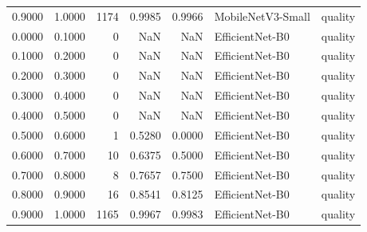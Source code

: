 \begin{tabular}{rrrrrll}
0.9000 & 1.0000 & 1174 & 0.9985 & 0.9966 & MobileNetV3-Small & quality \\
0.0000 & 0.1000 & 0 & NaN & NaN & EfficientNet-B0 & quality \\
0.1000 & 0.2000 & 0 & NaN & NaN & EfficientNet-B0 & quality \\
0.2000 & 0.3000 & 0 & NaN & NaN & EfficientNet-B0 & quality \\
0.3000 & 0.4000 & 0 & NaN & NaN & EfficientNet-B0 & quality \\
0.4000 & 0.5000 & 0 & NaN & NaN & EfficientNet-B0 & quality \\
0.5000 & 0.6000 & 1 & 0.5280 & 0.0000 & EfficientNet-B0 & quality \\
0.6000 & 0.7000 & 10 & 0.6375 & 0.5000 & EfficientNet-B0 & quality \\
0.7000 & 0.8000 & 8 & 0.7657 & 0.7500 & EfficientNet-B0 & quality \\
0.8000 & 0.9000 & 16 & 0.8541 & 0.8125 & EfficientNet-B0 & quality \\
0.9000 & 1.0000 & 1165 & 0.9967 & 0.9983 & EfficientNet-B0 & quality \\
\bottomrule
\end{tabular}
